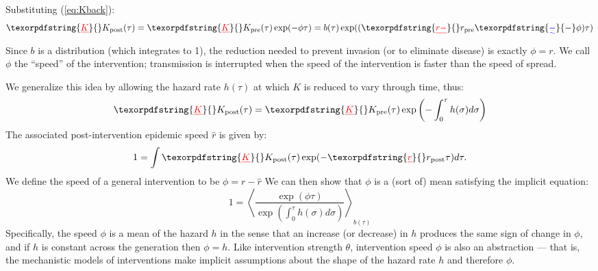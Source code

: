 \documentclass[12pt]{article}
\newcommand{\KK}{\ensuremath{{K}}} %
\newcommand{\Kx}[1]{\ensuremath{\KK_{\mathrm{#1}}}} %
\newcommand{\Kpre}{\Kx{pre}} %
\newcommand{\Kpost}{\Kx{post}} %
\newcommand{\rr}{\ensuremath{{r}}}
\newcommand{\rx}[1]{\ensuremath{\rr_{\mathrm{#1}}}} %
\newcommand{\rpre}{\rx{pre}} %
\newcommand{\rpost}{\rx{post}} %
\renewcommand{\eqref}[1]{(\ref{eq:#1})} %
\newcommand{\eqlab}[1]{\label{eq:#1}}
\providecommand{\DIFaddtex}[1]{{\protect\color{blue}\uwave{#1}}} %
\providecommand{\DIFdeltex}[1]{{\protect\color{red}\sout{#1}}}                      %
\providecommand{\DIFaddbegin}{} %
\providecommand{\DIFaddend}{} %
\providecommand{\DIFdelbegin}{} %
\providecommand{\DIFdelend}{} %
\providecommand{\DIFadd}[1]{\texorpdfstring{\DIFaddtex{#1}}{#1}} %
\providecommand{\DIFdel}[1]{\texorpdfstring{\DIFdeltex{#1}}{}} %
\newcommand{\DIFscaledelfig}{0.5}
\newlength{\DIFdelgraphicswidth} %
\newlength{\DIFdelgraphicsheight} %
\newcommand{\DIFaddincludegraphics}[2][]{{\color{blue}\fbox{\DIFOincludegraphics[#1]{#2}}}} %
\newcommand{\DIFdelincludegraphics}[2][]{%
\sbox{\DIFdelgraphicsbox}{\DIFOincludegraphics[#1]{#2}}%
\settoboxwidth{\DIFdelgraphicswidth}{\DIFdelgraphicsbox} %
\settoboxtotalheight{\DIFdelgraphicsheight}{\DIFdelgraphicsbox} %
\scalebox{\DIFscaledelfig}{%
\parbox[b]{\DIFdelgraphicswidth}{\usebox{\DIFdelgraphicsbox}\\[-\baselineskip] \rule{\DIFdelgraphicswidth}{0em}}\llap{\resizebox{\DIFdelgraphicswidth}{\DIFdelgraphicsheight}{%
\setlength{\unitlength}{\DIFdelgraphicswidth}%
\begin{picture}(1,1)%
\thicklines\linethickness{2pt} %
{\color[rgb]{1,0,0}\put(0,0){\framebox(1,1){}}}%
{\color[rgb]{1,0,0}\put(0,0){\line( 1,1){1}}}%
{\color[rgb]{1,0,0}\put(0,1){\line(1,-1){1}}}%
\end{picture}%
}\hspace*{3pt}}} %
} %
\DeclareRobustCommand{\DIFaddbegin}{\DIFOaddbegin \let\includegraphics\DIFaddincludegraphics} %
\DeclareRobustCommand{\DIFaddend}{\DIFOaddend \let\includegraphics\DIFOincludegraphics} %
\DeclareRobustCommand{\DIFdelbegin}{\DIFOdelbegin \let\includegraphics\DIFdelincludegraphics} %
\DeclareRobustCommand{\DIFdelend}{\DIFOaddend \let\includegraphics\DIFOincludegraphics} %
\begin{document}
Substituting \eqref{Kback}:
\begin{equation}
	\DIFdelbegin %
\DIFdel{K}\DIFdelend \DIFaddbegin \Kpost\DIFaddend (\tau) = \DIFdelbegin \DIFdel{K}\DIFdelend \DIFaddbegin \Kpre\DIFaddend (\tau)\exp(-\phi\tau) = b(\tau)\exp((\DIFdelbegin \DIFdel{r-}\DIFdelend \DIFaddbegin \rpre\DIFadd{-}\DIFaddend \phi)\tau)
\end{equation}
Since $b$ is a distribution (which integrates to 1), the reduction needed to prevent invasion (or to eliminate disease) is exactly \DIFdelbegin \DIFdel{$\phi=r$}\DIFdelend \DIFaddbegin \DIFadd{$\phi=\rpre$}\DIFaddend . 
We call $\phi$ the ``speed'' of the intervention; transmission is interrupted when the speed of the intervention is faster than the speed of spread.

We generalize this idea by allowing the hazard rate $h(\tau)$ at which $K$ is reduced to vary through time, thus:
\begin{equation}
	\DIFdelbegin %
\DIFdel{K}\DIFdelend \DIFaddbegin \Kpost\DIFaddend (\tau) = \DIFdelbegin \DIFdel{K}\DIFdelend \DIFaddbegin \Kpre\DIFaddend (\tau) \exp\left(-\int_0^\tau h(\sigma) d\sigma\right)
\end{equation}
The associated post-intervention epidemic speed \DIFdelbegin \DIFdel{$\hat r$ }\DIFdelend \DIFaddbegin \DIFadd{$\rpost$ }\DIFaddend is given by:
\begin{equation}
	1 = \int \DIFdelbegin %
\DIFdel{K}\DIFdelend \DIFaddbegin \Kpost\DIFaddend (\tau) \exp(-\DIFdelbegin %
\DIFdel{r}\DIFdelend \DIFaddbegin \rpost \DIFaddend \tau) d\tau.	
\end{equation}
We define the speed of a general intervention to be \DIFdelbegin \DIFdel{$\phi = r - \hat r$
}\DIFdelend \DIFaddbegin \DIFadd{$\phi = \rpre - \rpost$.
}\DIFaddend We can then show that $\phi$ is a (sort of) mean satisfying the implicit equation:
\begin{equation}
	1 = \left\langle \frac{\exp(\phi \tau) }{\exp\left(\int_0^\tau h(\sigma) d\sigma\right)} \right\rangle_{b(\tau)}
	\eqlab{speedMean}
\end{equation}
Specifically, the speed $\phi$ is a mean of the hazard $h$ in the sense that an increase (or decrease) in $h$ produces the same sign of change in $\phi$, and if $h$ is constant across the generation then $\phi=h$.
Like intervention strength $\theta$, intervention speed $\phi$ is also an abstraction --- that is, the mechanistic models of interventions make implicit assumptions about the shape of the hazard rate $h$ and therefore $\phi$.
\end{document}
